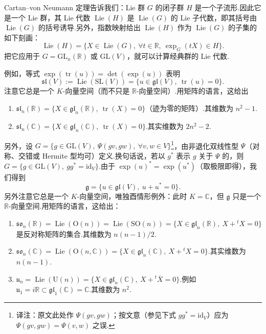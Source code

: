 \begin{numpara}[经典 Lie 代数]\label{np:ssl-1-3-4}
Cartan--von Neumann 定理告诉我们：Lie 群 $G$ 的闭子群 $H$ 是一个子流形.因此它是一个 Lie 群，其 Lie 代数 $\operatorname{Lie}(H)$ 是 $\operatorname{Lie}(G)$ 的 Lie 子代数，即其括号由 $\operatorname{Lie}(G)$ 的括号诱导.另外，指数映射给出 $\operatorname{Lie}(H)$ 作为 $\operatorname{Lie}(G)$ 的子集的如下刻画：
\[
\operatorname{Lie}(H)=\{X\in\operatorname{Lie}(G),\ \forall t\in\mathbb{R},\ \exp_G(tX)\in H\}.
\]
把它应用于 $G=\mathrm{GL}_n(\mathbb{R})$ 或 $\mathrm{GL}(V)$，就可以计算经典群的 Lie 代数.

例如，等式 $\exp(\operatorname{tr}(u))=\det(\exp(u))$ 表明
\[
\mathfrak{sl}(V):=\operatorname{Lie}(\mathrm{SL}(V))=\{u\in\mathfrak{gl}(V),\ \operatorname{tr}(u)=0\}.
\]
注意它总是一个 $K$-向量空间（而不只是 $\mathbb{R}$-向量空间）.用矩阵的语言，这给出
\begin{enumerate}[label=\roman*)]
\item $\mathfrak{sl}_n(\mathbb{R})=\{X\in\mathfrak{gl}_n(\mathbb{R}),\ \operatorname{tr}(X)=0\}$（迹为零的矩阵）.其维数为 $n^{2}-1$.
\item $\mathfrak{sl}_n(\mathbb{C})=\{X\in\mathfrak{gl}_n(\mathbb{C}),\ \operatorname{tr}(X)=0\}$.其实维数为 $2n^{2}-2$.
\end{enumerate}
另外，设 $G=\{g\in\mathrm{GL}(V),\ \Psi(gv,gw),\ \forall v,w\in V\}$\footnote{译注：原文此处作 $\Psi(gv,gw)$；按文意（参见下式 $gg^{*}=\mathrm{id}_{V}$）应为 $\Psi(gv,gw)=\Psi(v,w)$ 之误.}，由非退化双线性型 $\Psi$（对称、交错或 Hermite 型均可）定义.换句话说，若以 $g^{*}$ 表示 $g$ 关于 $\Psi$ 的，则 $G=\{g\in\mathrm{GL}(V),\ gg^{*}=\mathrm{id}_{V}\}$.由于 $\exp(u)^{*}=\exp(u^{*})$（取极限即得），我们得到
\[
\mathfrak{g}=\{u\in\mathfrak{gl}(V),\ u+u^{*}=0\}.
\]
另外注意它总是一个 $K$-向量空间，唯独酉情形例外：此时 $K=\mathbb{C}$，但 $\mathfrak{g}$ 只是一个 $\mathbb{R}$-向量空间.用矩阵的语言，这给出：
\begin{enumerate}[label=\roman*),start=3]
\item $\mathfrak{so}_n(\mathbb{R})=\operatorname{Lie}(\mathrm{O}(n))=\operatorname{Lie}(\mathrm{SO}(n))=\{X\in\mathfrak{gl}_n(\mathbb{R}),\ X+{}^{t}X=0\}$ 是反对称矩阵的集合.其维数为 $n(n-1)/2$.
\item $\mathfrak{so}_n(\mathbb{C})=\operatorname{Lie}(\mathrm{O}(n,\mathbb{C}))=\{X\in\mathfrak{gl}_n(\mathbb{C}),\ X+{}^{t}X=0\}$.其实维数为 $n(n-1)$.
\item $\mathfrak{u}_n=\operatorname{Lie}(\mathrm{U}(n))=\{X\in\mathfrak{gl}_n(\mathbb{C}),\ X+{}^{t}\overline{X}=0\}$.例如 $\mathfrak{u}_1=i\mathbb{R}\subset\mathfrak{gl}_1(\mathbb{C})=\mathbb{C}$.其维数为 $n^{2}$.

\end{enumerate}
\end{numpara}
